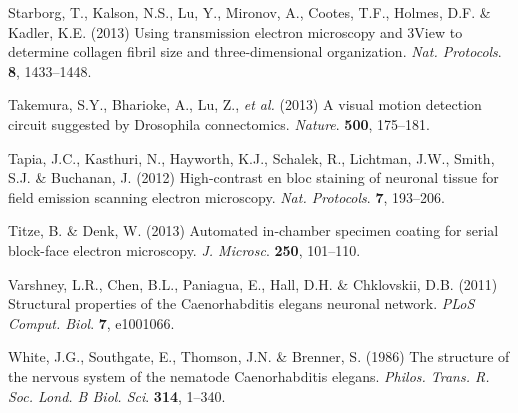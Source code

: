 \documentclass{article}
\begin{document}
\begin{hangpars}
Starborg, T., Kalson, N.S., Lu, Y., Mironov, A., Cootes, T.F., Holmes, D.F. \& Kadler, K.E. (2013) Using transmission electron microscopy and 3View to determine collagen fibril size and three-dimensional organization. \emph{Nat. Protocols}. \textbf{8}, 1433–1448.

Takemura, S.Y., Bharioke, A., Lu, Z., \emph{et al.} (2013) A visual motion detection circuit suggested by Drosophila connectomics. \emph{Nature}. \textbf{500}, 175–181.

Tapia, J.C., Kasthuri, N., Hayworth, K.J., Schalek, R., Lichtman, J.W., Smith, S.J. \& Buchanan, J. (2012) High-contrast en bloc staining of neuronal tissue for field emission scanning electron microscopy. \emph{Nat. Protocols}. \textbf{7}, 193–206.

Titze, B. \& Denk, W. (2013) Automated in-chamber specimen coating for serial block-face electron microscopy. \emph{J. Microsc}. \textbf{250}, 101–110.

Varshney, L.R., Chen, B.L., Paniagua, E., Hall, D.H. \& Chklovskii, D.B. (2011) Structural properties of the Caenorhabditis elegans neuronal network. \emph{PLoS Comput. Biol}. \textbf{7}, e1001066.

White, J.G., Southgate, E., Thomson, J.N. \& Brenner, S. (1986) The structure of the nervous system of the nematode Caenorhabditis elegans. \emph{Philos. Trans. R. Soc. Lond. B Biol. Sci}. \textbf{314}, 1–340.
\end{hangpars}
\end{document}
